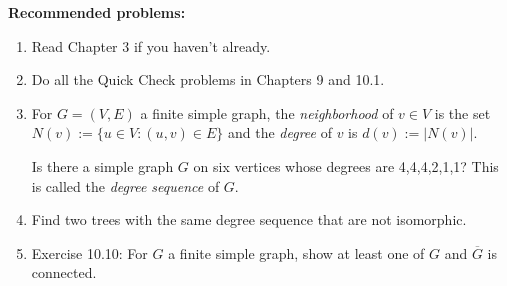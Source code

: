 \documentclass[11pt,letterpaper]{article}
\begin{document}
\textbf{Recommended problems:}
\begin{enumerate}


\item Read Chapter 3 if you haven't already.

\item Do all the Quick Check problems in Chapters 9 and 10.1.
\item For $G = (V,E)$ a finite simple graph, the \emph{neighborhood} of $v \in V$ is the set $N(v) := \{u \in V: (u,v) \in E\}$ and the \emph{degree} of $v$ is $d(v) := |N(v)|$.

Is there a simple graph $G$ on six vertices whose degrees are 4,4,4,2,1,1?
This is called the \emph{degree sequence} of $G$.

\item Find two trees with the same degree sequence that are not isomorphic.
\item Exercise 10.10: For $G$ a finite simple graph, show at least one of $G$ and $\overline{G}$ is connected.



\end{enumerate}
\end{document}
